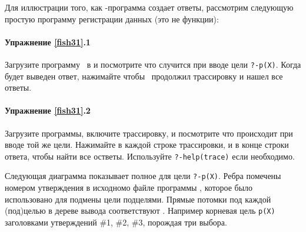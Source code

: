 \label{fish31}

Для иллюстрации того, как \prolog-программа создает ответы, рассмотрим следующую
простую программу регистрации данных (это не функции):


\paragraph{Упражнение \ref{fish31}.1} Загрузите программу \ в \prolog и
посмотрите что случится при вводе цели \verb|?-p(X)|. Когда будет выведен ответ,
нажимайте \keys{;} чтобы \prolog\ продолжил трассировку и нашел все ответы.

\paragraph{Упражнение \ref{fish31}.2} Загрузите программы, включите
трассировку, и посмотрите что происходит при вводе той же цели.
Нажимайте  в каждой строке трассировки, и \keys{;} в
конце строки ответа, чтобы найти все остветы. Используйте \verb|?-help(trace)|
если необходимо.


Следующая диаграмма показывает полное  для
цели \verb|?-p(X)|. Ребра помечены номером утверждения в исходномо файле
программы , которое было использовано для подмены цели подцелями.
Прямые потомки под каждой (под)целью в дереве вывода соответствуют
. Например корневая цель \verb|p(X)|
 заголовками утверждений \#1, \#2, \#3,
порождая три выбора.


